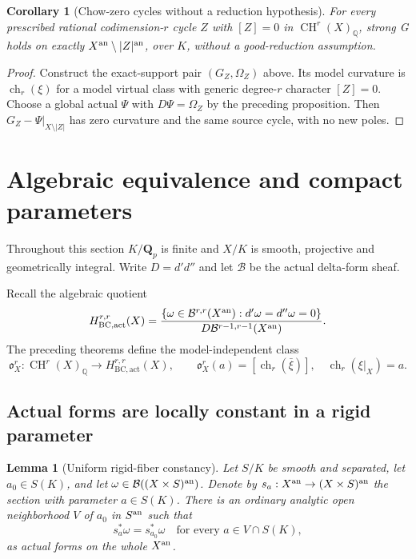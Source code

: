 \documentclass[11pt]{article}
\newtheorem{lemma}[theorem]{Lemma}
\newtheorem{corollary}[theorem]{Corollary}
\theoremstyle{definition}
\theoremstyle{remark}
\numberwithin{equation}{section}
\begin{document}
\begin{corollary}[Chow-zero cycles without a reduction hypothesis]
\label{r11p:chow-zero-G}
For every prescribed rational codimension-$r$ cycle $Z$ with
$[Z]=0$ in $\operatorname{CH}^r(X)_{\mathbb Q}$, strong G holds
on exactly $X^{\rm an}\setminus|Z|^{\rm an}$, over $K$, without
a good-reduction assumption.
\end{corollary}

\begin{proof}
Construct the exact-support pair $(G_Z,\Omega_Z)$ above.
Its model curvature is $\operatorname{ch}_r(\xi)$ for a model
virtual class with generic degree-$r$ character $[Z]=0$.
Choose a global actual $\Psi$ with $D\Psi=\Omega_Z$ by the preceding
proposition.  Then $G_Z-\Psi|_{X\setminus|Z|}$ has zero curvature
and the same source cycle, with no new poles.
\end{proof}




\section{Algebraic equivalence and compact parameters}
\label{r12p:section}

Throughout this section $K/\mathbf Q_p$ is finite and $X/K$ is smooth,
projective and geometrically integral.  Write $D=d'd''$ and let
$\mathcal B$ be the actual delta-form sheaf.

Recall the algebraic quotient
\[
 H_{\mathrm{BC,act}}^{r,r}(X)=
 \frac{\{\omega\in\mathcal B^{r,r}(X^{\rm an}):
                    d'\omega=d''\omega=0\}}
      {D\mathcal B^{r-1,r-1}(X^{\rm an})}.
\]
The preceding theorems define the model-independent class
\[
 \mathfrak o_X^r:\operatorname{CH}^r(X)_{\mathbb Q}
       \longrightarrow H_{\mathrm{BC,act}}^{r,r}(X),
 \qquad
 \mathfrak o_X^r(a)=[\operatorname{ch}_r(\bar\xi)],
 \quad \operatorname{ch}_r(\xi|_X)=a.
\tag{R12.P1}\label{r12p:obstruction}
\]


\subsection{Actual forms are locally constant in a rigid parameter}

\begin{lemma}[Uniform rigid-fiber constancy]
\label{r12p:rigid-fiber}
Let $S/K$ be smooth and separated, let $a_0\in S(K)$, and let
$\omega\in\mathcal B((X\times S)^{\rm an})$.  Denote by
$s_a:X^{\rm an}\to(X\times S)^{\rm an}$ the section with parameter
$a\in S(K)$.  There is an ordinary analytic open neighborhood $V$ of
$a_0$ in $S^{\rm an}$ such that
\[
                    s_a^*\omega=s_{a_0}^*\omega
       \quad\text{for every }a\in V\cap S(K),
\tag{R12.P2}\label{r12p:literal-constancy}
\]
as actual forms on the whole $X^{\rm an}$.
\end{lemma}
\end{document}
